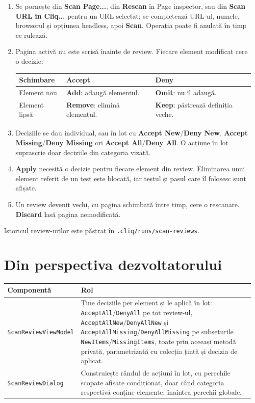 \documentclass[12pt,a4paper]{report}
\newcommand{\UI}[1]{\textbf{#1}}
\newcommand{\File}[1]{\nolinkurl{#1}}
\begin{document}
\begin{enumerate}
  \item Se pornește din \UI{Scan Page...}, din \UI{Rescan} în Page inspector, sau din \UI{Scan URL in Cliq...} pentru un URL selectat; se completează URL-ul, numele, browserul și opțiunea headless, apoi \UI{Scan}. Operația poate fi anulată în timp ce rulează.
  \item Pagina activă nu este scrisă înainte de review. Fiecare element modificat cere o decizie:
  \begin{tabularx}{\textwidth}{@{}p{3.5cm}YY@{}}
  \toprule \textbf{Schimbare} & \textbf{Accept} & \textbf{Deny} \\
  \midrule
  Element nou & \UI{Add}: adaugă elementul. & \UI{Omit}: nu îl adaugă. \\
  Element lipsă & \UI{Remove}: elimină elementul. & \UI{Keep}: păstrează definiția veche. \\
  \bottomrule
  \end{tabularx}
  \item Deciziile se dau individual, sau în lot cu \UI{Accept New}/\UI{Deny New}, \UI{Accept Missing}/\UI{Deny Missing} ori \UI{Accept All}/\UI{Deny All}. O acțiune în lot suprascrie doar deciziile din categoria vizată.
  \item \UI{Apply} necesită o decizie pentru fiecare element din review. Eliminarea unui element referit de un test este blocată, iar testul și pasul care îl folosesc sunt afișate.
  \item Un review devenit vechi, cu pagina schimbată între timp, cere o rescanare. \UI{Discard} lasă pagina nemodificată.
\end{enumerate}

Istoricul review-urilor este păstrat în \File{.cliq/runs/scan-reviews}.

\section{Din perspectiva dezvoltatorului}

\begin{tabularx}{\textwidth}{@{}p{5.3cm}Y@{}}
\toprule \textbf{Componentă} & \textbf{Rol} \\
\midrule
\File{ScanReviewViewModel} & Ține deciziile per element și le aplică în lot: \File{AcceptAll}/\File{DenyAll} pe tot review-ul, \File{AcceptAllNew}/\File{DenyAllNew} și \File{AcceptAllMissing}/\File{DenyAllMissing} pe subseturile \File{NewItems}/\File{MissingItems}, toate prin aceeași metodă privată, parametrizată cu colecția țintă și decizia de aplicat. \\
\File{ScanReviewDialog} & Construiește rândul de acțiuni în lot, cu perechile scopate afișate condiționat, doar când categoria respectivă conține elemente, înaintea perechii globale. \\
\bottomrule
\end{tabularx}
\end{document}
